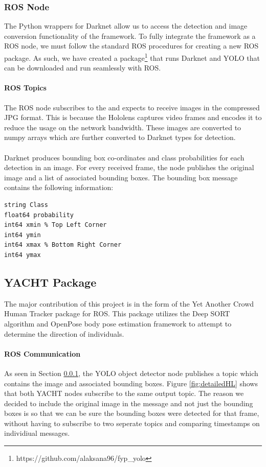 \subsubsection{ROS Node} \label{sec:nodeYOLO}
The Python wrappers for Darknet allow us to access the detection and image conversion functionality of the framework. To fully integrate the framework as a ROS node, we must follow the standard ROS procedures for creating a new ROS package. As such, we have created a package\footnote{https://github.com/alaksana96/fyp\_yolo} that runs Darknet and YOLO that can be downloaded and run seamlessly with ROS.

\paragraph{ROS Topics} The ROS node subscribes to the  and expects to receive images in the compressed JPG format. This is because the Hololens captures video frames and encodes it to reduce the usage on the network bandwidth. These images are converted to numpy arrays which are further converted to Darknet  types for detection. 

\paragraph{} Darknet produces bounding box co-ordinates and class probabilities for each detection in an image. For every received frame, the node publishes the original image and a list of associated bounding boxes. The bounding box message contains the following information: \\

\begin{lstlisting}[language=Mymatlab,caption={BoundingBox.msg},label={bbmsg}]
string Class
float64 probability
int64 xmin % Top Left Corner
int64 ymin
int64 xmax % Bottom Right Corner
int64 ymax
\end{lstlisting}

\subsection{YACHT Package}
The major contribution of this project is in the form of the Yet Another Crowd Human Tracker package for ROS. This package utilizes the Deep SORT algorithm and OpenPose body pose estimation framework to attempt to determine the direction of individuals.


\paragraph{ROS Communication} As seen in Section \ref{sec:nodeYOLO}, the YOLO object detector node publishes a topic which contains the image and associated bounding boxes. Figure \ref{fig:detailedHL} shows that both YACHT nodes subscribe to the same output topic. The reason we decided to include the original image in the message and not just the bounding boxes is so that we can be sure the bounding boxes were detected for that frame, without having to subscribe to two seperate topics and comparing timestamps on individiual messages.

